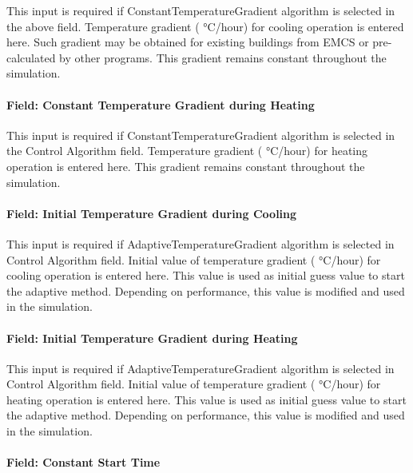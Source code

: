 This input is required if ConstantTemperatureGradient algorithm is selected in the above field. Temperature gradient ( °C/hour) for cooling operation is entered here. Such gradient may be obtained for existing buildings from EMCS or pre-calculated by other programs. This gradient remains constant throughout the simulation.

\paragraph{Field: Constant Temperature Gradient during Heating}\label{field-constant-temperature-gradient-during-heating}

This input is required if ConstantTemperatureGradient algorithm is selected in the Control Algorithm field. Temperature gradient ( °C/hour) for heating operation is entered here. This gradient remains constant throughout the simulation.

\paragraph{Field: Initial Temperature Gradient during Cooling}\label{field-initial-temperature-gradient-during-cooling}

This input is required if AdaptiveTemperatureGradient algorithm is selected in Control Algorithm field. Initial value of temperature gradient ( °C/hour) for cooling operation is entered here. This value is used as initial guess value to start the adaptive method. Depending on performance, this value is modified and used in the simulation.

\paragraph{Field: Initial Temperature Gradient during Heating}\label{field-initial-temperature-gradient-during-heating}

This input is required if AdaptiveTemperatureGradient algorithm is selected in Control Algorithm field. Initial value of temperature gradient ( °C/hour) for heating operation is entered here. This value is used as initial guess value to start the adaptive method. Depending on performance, this value is modified and used in the simulation.

\paragraph{Field: Constant Start Time}\label{field-constant-start-time}

